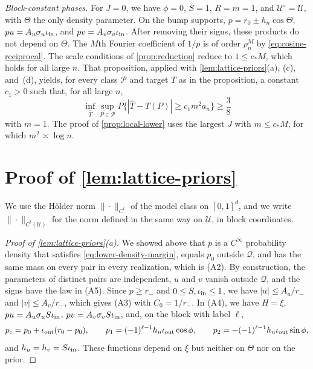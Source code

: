 \emph{Block-constant phases.} For $J=0$, we have $\phi=0$, $S=1$,
$R=m=1$, and $\mathcal U^\circ=\mathcal U$, with $\Theta$ the only
density parameter. On the bump supports, $p=r_0\pm h_n\cos\Theta$,
$pu=A_u\sigma_u\iota_{\rm in}$, and $pv=A_v\sigma_v\iota_{\rm in}$. After
removing their signs, these products do not depend on $\Theta$. The $M$th
Fourier coefficient of $1/p$ is of order $\rho_n^M$
by \eqref{eq:cosine-reciprocal}. The scale conditions of
\cref{prop:reduction} reduce to $1\le c_*M$, which holds
for all large $n$. That proposition, applied with
\cref{lem:lattice-priors}(a), (c), and~(d), yields, for every
class $\mathcal P$ and target $T$ as in the proposition, a constant
$c_1>0$ such that, for all large $n$,
\begin{equation}\label{eq:lattice-testing}
 \inf_{\widehat T}\sup_{P\in\mathcal P}
 P\{|\widehat T-T(P)|\ge c_1m^2a_n\}\ge\frac38
\end{equation}
with $m=1$. The proof of \cref{prop:local-lower} uses the
largest $J$ with $m\le c_*M$, for which $m^2\asymp\log n$.

\section{Proof of \texorpdfstring{\cref{lem:lattice-priors}}{the lemma on lattice priors}}
\label{lat:sec-properties}\label{lat:sec-proof}

We use the H\"older norm $\|\cdot\|_{C^t}$ of the model class on
$[0,1]^d$, and we write $\|\cdot\|_{C^t(\mathcal U)}$ for the norm
defined in the same way on $\mathcal U$, in block coordinates.

\begin{proof}[Proof of \cref{lem:lattice-priors}(a)]
We showed above that $p$ is a $C^\infty$ probability density that
satisfies \eqref{eq:lower-density-margin}, equals $p_0$ outside
$\mathcal Q$, and has the same mass on every pair in every
realization, which is (A2). By construction, the parameters of
distinct pairs are independent, $u$ and $v$ vanish outside
$\mathcal Q$, and the signs have the law in (A5). Since $p\ge r_-$ and
$0\le S,\iota_{\rm in}\le1$, we have $|u|\le A_u/r_-$ and
$|v|\le A_v/r_-$, which gives (A3) with $C_0=1/r_-$. In (A4), we have
$H=\xi$, $pu=A_u\sigma_uS\iota_{\rm in}$,
$pv=A_v\sigma_vS\iota_{\rm in}$, and, on the block with label $\ell$,
\[
 p_{\rm c}=p_0+\iota_{\rm out}(r_0-p_0),\qquad
 p_1=(-1)^{\ell-1}h_n\iota_{\rm out}\cos\phi,\qquad
 p_2=-(-1)^{\ell-1}h_n\iota_{\rm out}\sin\phi,
\]
and $h_u=h_v=S\iota_{\rm in}$. These functions depend on $\xi$ but
neither on $\Theta$ nor on the prior.
\end{proof}

